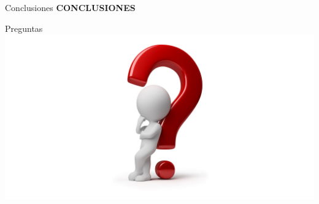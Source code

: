 \begin{frame}{Conclusiones}
  \centering
  \textbf{CONCLUSIONES}
\end{frame}

\begin{frame}{Preguntas}
  \centering
  \includegraphics[scale=0.2]{img/ed_inquiry}
\end{frame}

